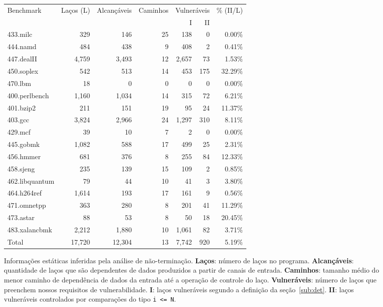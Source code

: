 \documentclass{llncs}
\begin{document}
\begin{figure}[t!]
\begin{center}
\renewcommand{\arraystretch}{1.2}
\begin{tabular*}{\textwidth}{@{\extracolsep{\fill}}lrrrrrr} \toprule
Benchmark			&		Laços (L)	&	Alcançáveis	&	Caminhos	&	\multicolumn{2}{c}{Vulneráveis} &	\% (II/L) \\ 
                                                                     \cmidrule{5-6} 
{}				&	{}		&	{}			&	{}				&	I		&	II	&	{}	\\ \midrule
433.milc			&	329		&	146			&	25				&	138		&	0	&	0.00\%	\\ 
444.namd			&	484		&	438			&	9				&	408		&	2	&	0.41\%	\\ 
447.dealII		&	4,759	&	3,493		&	12				&	2,657	&	73	&	1.53\%	\\ 
450.soplex		&	542		&	513			&	14				&	453		&	175	&	32.29\%	\\ 
470.lbm			&	18		&	0			&	0				&	0		&	0	&	0.00\%	\\ 
400.perlbench	&	1,160	&	1,034		&	14				&	315		&	72	&	6.21\%	\\ 
401.bzip2		&	211		&	151			&	19				&	95		&	24	&	11.37\%	\\ 
403.gcc			&	3,824	&	2,966		&	24				&	1,297	&	310	&	8.11\%	\\ 
429.mcf			&	39		&	10			&	7				&	2		&	0	&	0.00\%	\\
445.gobmk		&	1,082	&	588			&	17				&	499		&	25	&	2.31\%	\\ 
456.hmmer		&	681		&	376			&	8				&	255		&	84	&	12.33\%	\\ 
458.sjeng		&	235		&	139			&	15				&	109		&	2	&	0.85\%	\\ 
462.libquantum	&	79		&	44			&	10				&	41		&	3	&	3.80\%	\\ 
464.h264ref		&	1,614	&	193			&	17				&	161		&	9	&	0.56\%	\\ 
471.omnetpp		&	363		&	280			&	8				&	201		&	41	&	11.29\%	\\ 
473.astar		&	88		&	53			&	8				&	50		&	18	&	20.45\%	\\ 
483.xalancbmk	&	2,212	&	1,880		&	10				&	1,061	&	82	&	3.71\%	\\ \midrule
Total			&	17,720	&	12,304		&	13				&	7,742	&	920	&	5.19\%	\\ \bottomrule


\end{tabular*}
\end{center}
\caption{Informações estáticas inferidas pela análise de não-terminação.
{\bf Laços}: número de laços no programa.
{\bf Alcançáveis}: quantidade de laços que são dependentes de dados produzidos a
partir de canais de entrada.
{\bf Caminhos}: tamanho médio do menor caminho de dependência de dados da entrada
até a operação de controle do laço.
{\bf Vulneráveis}: número de laços que preenchem nossos requisitos de
vulnerabilidade.
{\bf I}: laços vulneráveis segundo a definição da seção~\ref{sub:det}.
{\bf II}: laços vulneráveis controlados por comparações do tipo
\texttt{i <= N}.}
\label{fig:staticLoopData}
\end{figure}
\end{document}
